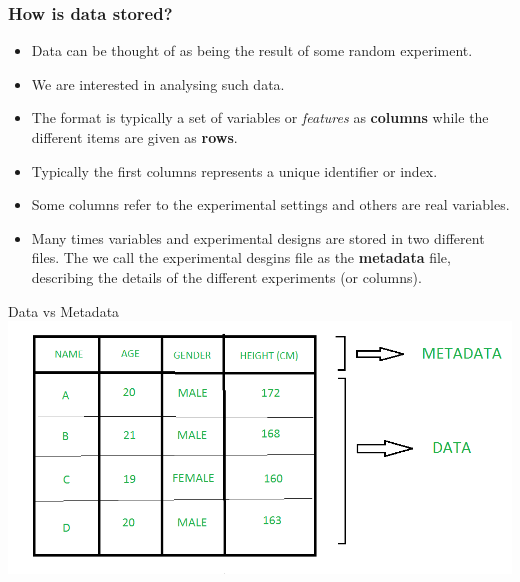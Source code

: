 \documentclass{beamer}
\begin{document}


\begin{frame}
\frametitle{How is data stored?}
\begin{itemize}
  \item Data can be thought of as being the result of some random experiment.
  \item We are interested in analysing such data.
  \item The format is typically a set of variables or {\em features} as {\bf columns} while the different items are given as {\bf rows}.
  \item Typically the first columns represents a unique identifier or index.
  \item Some columns refer to the experimental settings and others are real variables.
  \item Many times variables and experimental designs are stored in two different files. The we call the experimental desgins file as the {\bf metadata} file, describing the details of the different experiments (or columns).  
\end{itemize}
\end{frame}

\begin{frame}{Data vs Metadata}
  \includegraphics[width=\linewidth]{data_metadata}
\end{frame}
\end{document}
